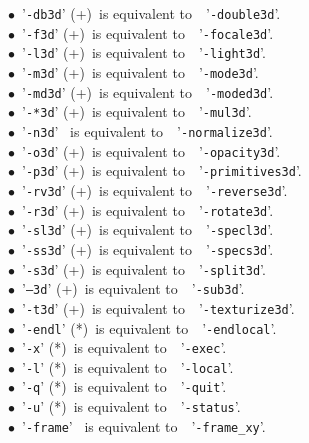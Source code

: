 \documentclass[a4paper,11pt,twoside]{book}
\begin{document}
$\bullet$~'\texttt{-db3d}' (+)~is equivalent to~~'\texttt{-double3d}'.\\
$\bullet$~'\texttt{-f3d}' (+)~is equivalent to~~'\texttt{-focale3d}'.\\
$\bullet$~'\texttt{-l3d}' (+)~is equivalent to~~'\texttt{-light3d}'.\\
$\bullet$~'\texttt{-m3d}' (+)~is equivalent to~~'\texttt{-mode3d}'.\\
$\bullet$~'\texttt{-md3d}' (+)~is equivalent to~~'\texttt{-moded3d}'.\\
$\bullet$~'\texttt{-*3d}' (+)~is equivalent to~~'\texttt{-mul3d}'.\\
$\bullet$~'\texttt{-n3d}' ~is equivalent to~~'\texttt{-normalize3d}'.\\
$\bullet$~'\texttt{-o3d}' (+)~is equivalent to~~'\texttt{-opacity3d}'.\\
$\bullet$~'\texttt{-p3d}' (+)~is equivalent to~~'\texttt{-primitives3d}'.\\
$\bullet$~'\texttt{-rv3d}' (+)~is equivalent to~~'\texttt{-reverse3d}'.\\
$\bullet$~'\texttt{-r3d}' (+)~is equivalent to~~'\texttt{-rotate3d}'.\\
$\bullet$~'\texttt{-sl3d}' (+)~is equivalent to~~'\texttt{-specl3d}'.\\
$\bullet$~'\texttt{-ss3d}' (+)~is equivalent to~~'\texttt{-specs3d}'.\\
$\bullet$~'\texttt{-s3d}' (+)~is equivalent to~~'\texttt{-split3d}'.\\
$\bullet$~'\texttt{--3d}' (+)~is equivalent to~~'\texttt{-sub3d}'.\\
$\bullet$~'\texttt{-t3d}' (+)~is equivalent to~~'\texttt{-texturize3d}'.\\
$\bullet$~'\texttt{-endl}' (*)~is equivalent to~~'\texttt{-endlocal}'.\\
$\bullet$~'\texttt{-x}' (*)~is equivalent to~~'\texttt{-exec}'.\\
$\bullet$~'\texttt{-l}' (*)~is equivalent to~~'\texttt{-local}'.\\
$\bullet$~'\texttt{-q}' (*)~is equivalent to~~'\texttt{-quit}'.\\
$\bullet$~'\texttt{-u}' (*)~is equivalent to~~'\texttt{-status}'.\\
$\bullet$~'\texttt{-frame}' ~is equivalent to~~'\texttt{-frame\_xy}'.\\
\end{document}
